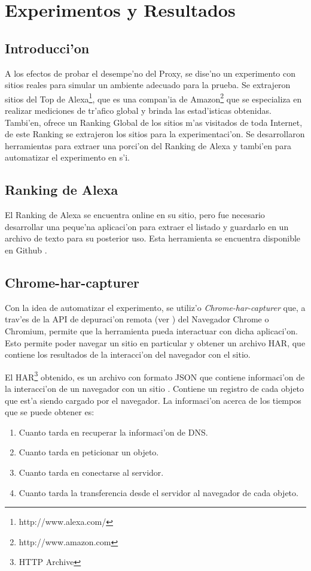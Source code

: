 \chapter{Experimentos y Resultados}

\section{Introducci'on}

A los efectos de probar el desempe'no del Proxy, se dise'no un experimento con sitios reales para simular un ambiente adecuado para la prueba. Se extrajeron sitios del Top de Alexa\footnote{http://www.alexa.com/}, que es una compan'ia de Amazon\footnote{http://www.amazon.com} que se especializa en realizar mediciones de tr'afico global y brinda las estad'isticas obtenidas. Tambi'en, ofrece un Ranking Global de los sitios m'as visitados de toda Internet, de este Ranking se extrajeron los sitios para la experimentaci'on. Se desarrollaron herramientas para extraer una porci'on del Ranking de Alexa y tambi'en para automatizar el experimento en s'i.

\section{Ranking de Alexa}
\label{rankingalexa}
El Ranking de Alexa se encuentra online en su sitio, pero fue necesario desarrollar una peque'na aplicaci'on para extraer el listado y guardarlo en un archivo de texto para su posterior uso. Esta herramienta se encuentra disponible en Github \citep{alexatop}.

\section{Chrome-har-capturer}

Con la idea de automatizar el experimento, se utiliz'o \emph{Chrome-har-capturer} \citep{harcapturer} que, a trav'es de la API de depuraci'on remota (ver \citep{debugger}) del Navegador Chrome o Chromium, permite que la herramienta pueda interactuar con dicha aplicaci'on. Esto permite  poder navegar un sitio en particular y obtener un archivo HAR, que contiene los resultados de la interacci'on del navegador con el sitio.

El HAR\footnote{HTTP Archive} obtenido, es un archivo con formato JSON que contiene informaci'on de la interacci'on de un navegador con un sitio \citep{harSpec}. Contiene un registro de cada objeto que est'a siendo cargado por el navegador. La informaci'on acerca de los tiempos que se puede obtener es:
\begin{enumerate}
\item Cuanto tarda en recuperar la informaci'on de DNS.
\item Cuanto tarda en peticionar un objeto.
\item Cuanto tarda en conectarse al servidor.
\item Cuanto tarda la transferencia desde el servidor al navegador de cada objeto.
\end{enumerate}

